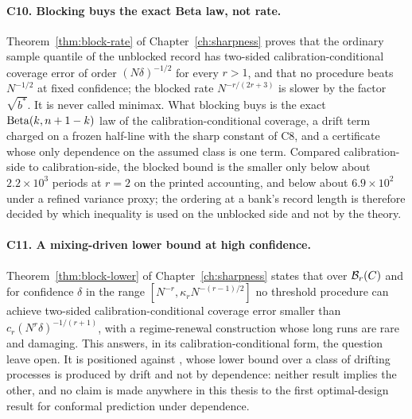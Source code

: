 \documentclass[../../../main.tex]{subfiles}
\begin{document}
\paragraph{C10. Blocking buys the exact Beta law, not rate.} Theorem~\ref{thm:block-rate} of Chapter~\ref{ch:sharpness} proves that the ordinary sample quantile of the unblocked record has two-sided calibration-conditional coverage error of order $(N\delta)^{-1/2}$ for every $r>1$, and that no procedure beats $N^{-1/2}$ at fixed confidence; the blocked rate $N^{-r/(2r+3)}$ is slower by the factor $\sqrt{b^*}$. It is never called minimax. What blocking buys is the exact $\operatorname{Beta}(k,n+1-k)$ law of the calibration-conditional coverage, a drift term charged on a frozen half-line with the sharp constant of C8, and a certificate whose only dependence on the assumed class is one term. Compared calibration-side to calibration-side, the blocked bound is the smaller only below about $2.2\times10^3$ periods at $r=2$ on the printed accounting, and below about $6.9\times10^2$ under a refined variance proxy; the ordering at a bank's record length is therefore decided by which inequality is used on the unblocked side and not by the theory.

\paragraph{C11. A mixing-driven lower bound at high confidence.} Theorem~\ref{thm:block-lower} of Chapter~\ref{ch:sharpness} states that over $\mathcal B_{r}(C)$ and for confidence $\delta$ in the range $[N^{-r},\kappa_rN^{-(r-1)/2}]$ no threshold procedure can achieve two-sided calibration-conditional coverage error smaller than $c_r(N^r\delta)^{-1/(r+1)}$, with a regime-renewal construction whose long runs are rare and damaging. This answers, in its calibration-conditional form, the question \citet[Sec.~4]{barber2026} leave open. It is positioned against \citet[Thm.~4]{halkiewicz2026}, whose lower bound over a class of drifting processes is produced by drift and not by dependence: neither result implies the other, and no claim is made anywhere in this thesis to the first optimal-design result for conformal prediction under dependence.

\end{document}
